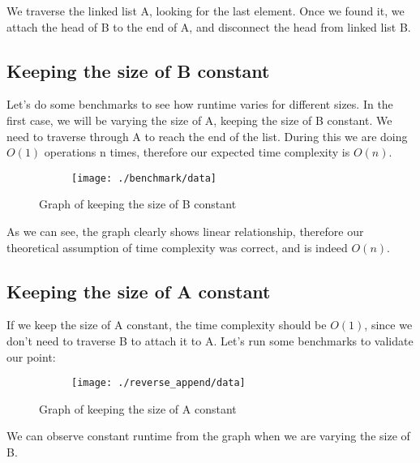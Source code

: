 \documentclass[a4paper,11pt]{article}
\begin{document}
    We traverse the linked list A, looking for the last element.
    Once we found it, we attach the head of B to the end of A, and disconnect the head from linked list B.

    \subsection*{Keeping the size of B constant}

    Let's do some benchmarks to see how runtime varies for different sizes.
    In the first case, we will be varying the size of A, keeping the size of B constant.
    We need to traverse through A to reach the end of the list.
    During this we are doing $O(1)$ operations n times, therefore our expected time complexity is $O(n)$.

    \begin{figure}[h]
        \centering
        \begin{subfigure}[b]{.5\textwidth}
            \centering
            \texttt{[image: ./benchmark/data]} %
        \end{subfigure}
        \caption{Graph of keeping the size of B constant}
        \label{fig:graph_1}
    \end{figure}

    As we can see, the graph clearly shows linear relationship, therefore our theoretical assumption of time complexity was correct, and is indeed $O(n)$.

    \subsection*{Keeping the size of A constant}

    If we keep the size of A constant, the time complexity should be $O(1)$, since we don't need to traverse B to attach it to A.
    Let's run some benchmarks to validate our point:

    \begin{figure}[h]
        \centering
        \begin{subfigure}[b]{.5\textwidth}
            \centering
            \texttt{[image: ./reverse\_append/data]} %
        \end{subfigure}
        \caption{Graph of keeping the size of A constant}
        \label{fig:graph_2}
    \end{figure}

    We can observe constant runtime from the graph when we are varying the size of B\@.
\end{document}
